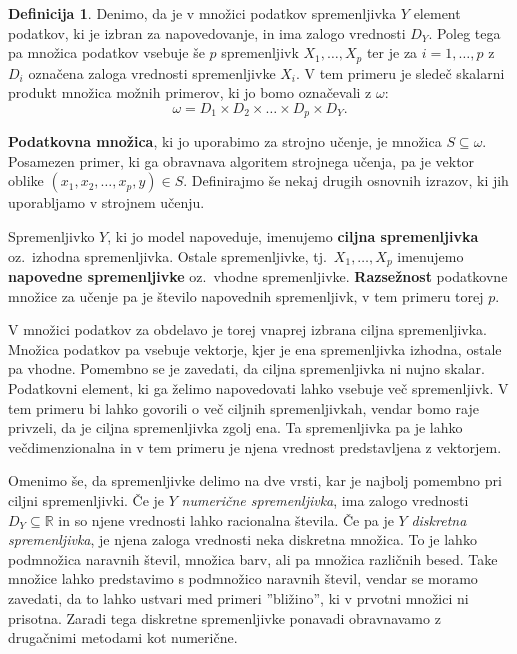 \documentclass[12pt,a4paper,twoside]{article}
\theoremstyle{definition} %
\newtheorem{definicija}{Definicija}[section]
\theoremstyle{plain} %
\numberwithin{equation}{section}  %
\begin{document}
\begin{definicija}
Denimo, da je v množici podatkov spremenljivka $Y$ element podatkov, ki je izbran za napovedovanje, in ima zalogo vrednosti $D_Y$. 
Poleg tega pa množica podatkov vsebuje še $p$ spremenljivk $X_1, \ldots , X_p$ ter je za $i = 1, \ldots, p$ z $D_i$ označena zaloga vrednosti spremenljivke $X_i$. 
V tem primeru je sledeč skalarni produkt množica možnih primerov, ki jo bomo označevali z $\omega$:
$$
\omega = D_1 \times D_2 \times \dots \times D_p \times D_Y.
$$

\textbf{Podatkovna množica}, ki jo uporabimo za strojno učenje, je množica $S \subseteq \omega$. 
Posamezen primer, ki ga obravnava algoritem strojnega učenja, pa je vektor oblike $(x_1, x_2, \ldots , x_p, y) \in S$. 
Definirajmo še nekaj drugih osnovnih izrazov, ki jih uporabljamo v strojnem učenju.

Spremenljivko $Y$, ki jo model napoveduje, imenujemo \textbf{ciljna spremenljivka} oz.~izhodna spremenljivka. 
Ostale spremenljivke, tj.~$X_1, \ldots , X_p$ imenujemo \textbf{napovedne spremenljivke} oz.~vhodne spremenljivke. 
\textbf{Razsežnost} podatkovne množice za učenje pa je število napovednih spremenljivk, v tem primeru torej $p$.
\end{definicija}

V množici podatkov za obdelavo je torej vnaprej izbrana ciljna spremenljivka. 
Množica podatkov pa vsebuje vektorje, kjer je ena spremenljivka izhodna, ostale pa vhodne. 
Pomembno se je zavedati, da ciljna spremenljivka ni nujno skalar. 
Podatkovni element, ki ga želimo napovedovati lahko vsebuje več spremenljivk. 
V tem primeru bi lahko govorili o več ciljnih spremenljivkah, vendar bomo raje privzeli, da je ciljna spremenljivka zgolj ena. 
Ta spremenljivka pa je lahko večdimenzionalna in v tem primeru je njena vrednost predstavljena z vektorjem.


Omenimo še, da spremenljivke delimo na dve vrsti, kar je najbolj pomembno pri ciljni spremenljivki. Če je $Y$ \emph{numerične spremenljivka}, ima zalogo vrednosti $D_Y \subseteq \mathbb{R}$ in so njene vrednosti lahko racionalna števila. Če pa je $Y$ \emph{diskretna spremenljivka}, je njena zaloga vrednosti neka diskretna množica. To je lahko podmnožica naravnih števil, množica barv, ali pa množica različnih besed. Take množice lahko predstavimo s podmnožico naravnih števil, vendar se moramo zavedati, da to lahko ustvari med primeri ''bližino'', ki v prvotni množici ni prisotna. Zaradi tega diskretne spremenljivke ponavadi obravnavamo z drugačnimi metodami kot numerične.
\end{document}
